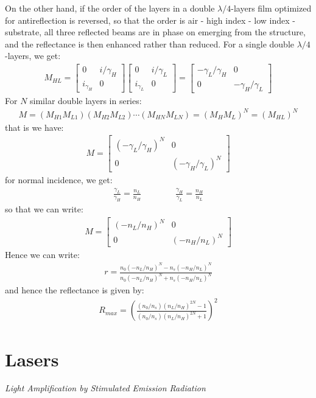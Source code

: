 \documentclass[11pt]{book}
\theoremstyle{break}
\theoremstyle{break}
\newcommand{\bmat}[1]{\begin{bmatrix} #1 \end{bmatrix}}
\begin{document}
On the other hand, if the order of the layers in a double $\lambda/4$-layers film optimized for antireflection is reversed, so that the order is air - high index - low index - substrate, all three reflected beams are in phase on emerging from the structure, and the reflectance is then enhanced rather than reduced. For a single double $\lambda/4$-layers, we get:
\begin{align*}
M_{HL} = \bmat{0& i/\gamma_H \\ i_{\gamma_H} &0}\bmat{0& i/\gamma_L \\ i_{\gamma_L} &0} = \bmat{-\gamma_L/ \gamma_H & 0 \\ 0& -\gamma_H/ \gamma_L}
\tag{double $\lambda/4$-layers}
\end{align*}
For $N$ similar double layers in series:
\begin{align*}
M = (M_{H1}M_{L1})(M_{H2}M_{L2})\cdots (M_{HN}M_{LN}) = (M_H M_L)^N = (M_{HL})^N
\end{align*}
that is we have:
\begin{align*}
M = \bmat{(-\gamma_L/\gamma_H)^N & 0 \\ 0 & (-\gamma_H / \gamma_L)^N}
\tag{N $\lambda/4$-layers}
\end{align*}
for normal incidence, we get:
\begin{align*}
\frac{\gamma_L}{\gamma_H} =\frac{n_L}{n_H} \qquad\qquad \frac{\gamma_H}{\gamma_L} = \frac{n_H}{n_L}
\end{align*}
so that we can write:
\begin{align*}
M = \bmat{(-n_L/n_H)^N & 0 \\ 0 & (-n_H/n_L)^N} \tag{nomal incidence N $\lambda/4$-layers}
\end{align*}
Hence we can write:
\begin{align*}
r = \frac{n_0(-n_L/n_H)^N - n_s(-n_H/n_L)^N}{n_0(-n_L/n_H)^N + n_s(-n_H/n_L)^N} \tag{nomal incidence N $\lambda/4$-layers}
\end{align*}
and hence the reflectance is given by:
\begin{align*}
R_{max} = \left( \frac{(n_0/n_s) (n_L/n_H)^{2N} - 1}{(n_0/n_s)(n_L/n_H)^{2N} + 1}\right)^2 \tag{nomal incidence N $\lambda/4$-layers}
\end{align*}

\chapter{Lasers}
\textit{Light Amplification by Stimulated Emission Radiation}\\
\end{document}
